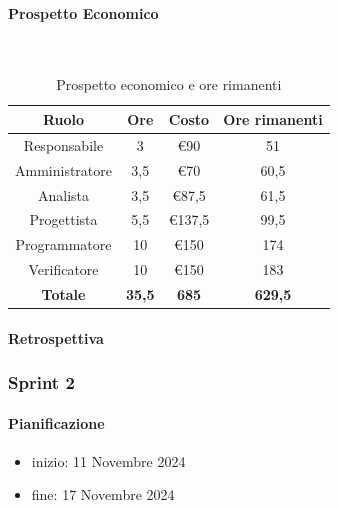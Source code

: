 \documentclass{article}
\begin{document}
                \paragraph{Prospetto Economico}\mbox{}\\
                \begin{table}[H]
                    \centering
                    \begin{tabular}{|c|c|c|c|}
                    \hline
                    \textbf{Ruolo}  & \textbf{Ore}  & \textbf{Costo} & \textbf{Ore rimanenti} \\ \hline
                    Responsabile    & 3             & €90            & 51                     \\ \hline
                    Amministratore  & 3,5           & €70            & 60,5                   \\ \hline
                    Analista        & 3,5           & €87,5          & 61,5                   \\ \hline
                    Progettista     & 5,5           & €137,5         & 99,5                   \\ \hline
                    Programmatore   & 10            & €150           & 174                    \\ \hline
                    Verificatore    & 10            & €150           & 183                    \\ \hline
                    \textbf{Totale} & \textbf{35,5} & \textbf{685}   & \textbf{629,5}         \\ \hline
                    \end{tabular}
                    \caption{Prospetto economico e ore rimanenti}
                \end{table}

                \paragraph{Retrospettiva}
            \subsubsection{Sprint 2}
                \paragraph{Pianificazione}
                \begin{itemize}
                    \item inizio: 11 Novembre 2024
                    \item fine: 17 Novembre 2024
                \end{itemize}
\end{document}
